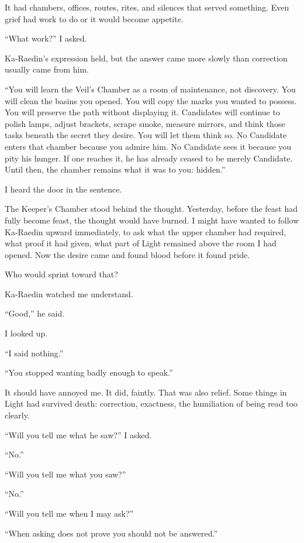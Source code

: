It had chambers, offices, routes, rites, and silences that served something.
Even grief had work to do or it would become appetite.\par
``What work?'' I asked.\par
Ka-Raedin's expression held, but the answer came more slowly than correction usually came from him.\par
``You will learn the Veil's Chamber as a room of maintenance, not discovery.
You will clean the basins you opened.
You will copy the marks you wanted to possess.
You will preserve the path without displaying it.
Candidates will continue to polish lamps, adjust brackets, scrape smoke, measure mirrors, and think those tasks beneath the secret they desire.
You will let them think so.
No Candidate enters that chamber because you admire him.
No Candidate sees it because you pity his hunger.
If one reaches it, he has already ceased to be merely Candidate.
Until then, the chamber remains what it was to you: hidden.''\par
I heard the door in the sentence.\par
The Keeper's Chamber stood behind the thought.
Yesterday, before the feast had fully become feast, the thought would have burned.
I might have wanted to follow Ka-Raedin upward immediately, to ask what the upper chamber had required, what proof it had given, what part of Light remained above the room I had opened.
Now the desire came and found blood before it found pride.\par
Who would sprint toward that?\par
Ka-Raedin watched me understand.\par
``Good,'' he said.\par
I looked up.\par
``I said nothing.''\par
``You stopped wanting badly enough to speak.''\par
It should have annoyed me.
It did, faintly.
That was also relief.
Some things in Light had survived death: correction, exactness, the humiliation of being read too clearly.\par
``Will you tell me what he saw?'' I asked.\par
``No.''\par
``Will you tell me what you saw?''\par
``No.''\par
``Will you tell me when I may ask?''\par
``When asking does not prove you should not be answered.''\par
